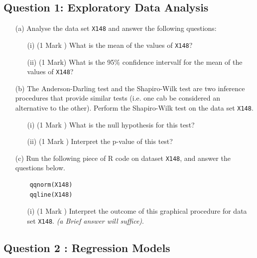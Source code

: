 \documentclass[a4paper,12pt]{article}
\begin{document}
\subsection*{Question 1: Exploratory Data Analysis}
\begin{itemize}
	\item[(a)] Analyse the data set \texttt{X148} and answer the following questions:
	\begin{itemize}
		\item[(i)] (1 Mark ) What is the mean of the values of \texttt{X148}?		
		\item[(ii)] (1 Mark) What is the 95\% confidence intervalf for the mean of the values of \texttt{X148}?		
	\end{itemize}
	
	\item[(b)] The Anderson-Darling test and the Shapiro-Wilk test are two inference procedures that provide similar tests (i.e. one cab be considered an alternative to the other).
	Perform the Shapiro-Wilk test on the data set \texttt{X148}. 
	\begin{itemize}
		\item[(i)] (1 Mark ) What is the null hypothesis for this test?		
		 \item[(ii)] (1 Mark ) Interpret the p-value of this test?				
	\end{itemize}
	
	
	\item[(c)] Run the following piece of R code on dataset \texttt{X148}, and answer the questions below.
	\begin{framed}
	\begin{verbatim}
	qqnorm(X148)
	qqline(X148)
	\end{verbatim}
	\end{framed}
\begin{itemize}
	\item[(i)] (1 Mark ) Interpret the outcome of this graphical procedure for data set \texttt{X148}. \textit{(a Brief answer will suffice)}.	
\end{itemize}
\end{itemize}
\newpage

\subsection*{Question 2 : Regression Models}
\end{document}
